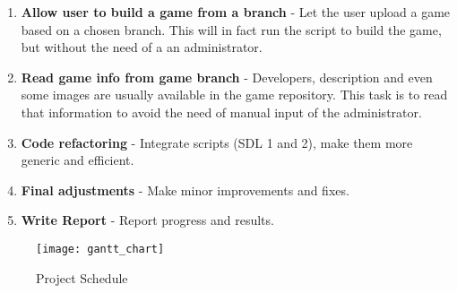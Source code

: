 \begin{enumerate}
\item \textbf{Allow user to build a game from a branch} - Let the user upload a game based on a chosen branch. This will in fact run the script to build the game, but without the need of a an administrator.
\item \textbf{Read game info from game branch} - Developers, description and even some images are usually available in the game repository. This task is to read that information to avoid the need of manual input of the administrator.
\item \textbf{Code refactoring} - Integrate scripts (SDL 1 and 2), make them more generic and efficient.
\item \textbf{Final adjustments} - Make minor improvements and fixes.
\item \textbf{Write Report} - Report progress and results.
\end{enumerate}

\begin{figure}[h!]
\centering
\texttt{[image: gantt\_chart]}
\caption{Project Schedule}
\label{fig:schedule}
\end{figure}
